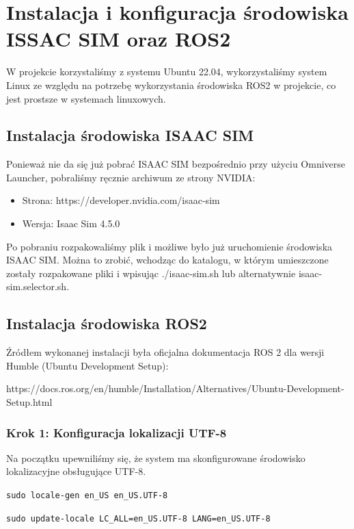 \documentclass[12pt]{article}
\begin{document}
\clearpage

\section{Instalacja i konfiguracja środowiska ISSAC SIM oraz ROS2}

W projekcie korzystaliśmy z systemu Ubuntu 22.04, wykorzystaliśmy system Linux ze względu na potrzebę wykorzystania środowiska ROS2 w projekcie, co jest prostsze w systemach linuxowych.   

\subsection{Instalacja środowiska ISAAC SIM}

Ponieważ nie da się już pobrać ISAAC SIM bezpośrednio przy użyciu Omniverse Launcher, pobraliśmy ręcznie archiwum ze strony NVIDIA:

\begin{itemize}
    \item Strona: https://developer.nvidia.com/isaac-sim
    \item Wersja: Isaac Sim 4.5.0
\end{itemize}

Po pobraniu rozpakowaliśmy plik i możliwe było już uruchomienie środowiska ISAAC SIM. Można to zrobić, wchodząc do katalogu, w którym umieszczone zostały rozpakowane pliki i wpisując ./isaac-sim.sh lub alternatywnie isaac-sim.selector.sh.

 

\subsection{Instalacja środowiska ROS2}

Źródłem wykonanej instalacji była oficjalna dokumentacja ROS 2 dla wersji Humble (Ubuntu Development Setup):

 https://docs.ros.org/en/humble/Installation/Alternatives/Ubuntu-Development-Setup.html


\subsubsection{Krok 1: Konfiguracja lokalizacji UTF-8}
Na początku upewniliśmy się, że system ma skonfigurowane środowisko lokalizacyjne obsługujące UTF-8.


\texttt{sudo locale-gen en\_US en\_US.UTF-8}

\texttt{sudo update-locale LC\_ALL=en\_US.UTF-8 LANG=en\_US.UTF-8}
\end{document}
